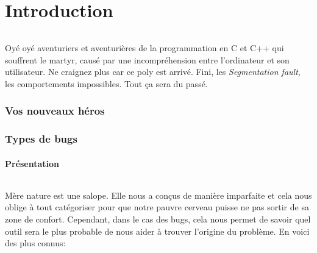 \part{Introduction}

\paragraph{} Oyé oyé aventuriers et aventurières de la programmation en C et
C++ qui souffrent le martyr, causé par une incompréhension entre l'ordinateur
et son utilisateur. Ne craignez plus car ce poly est arrivé. Fini, les
\textit{Segmentation fault}, les comportements impossibles. Tout ça sera du
passé.

\section{Vos nouveaux héros}


\section{Types de bugs}

\subsection{Présentation}

\paragraph{} Mère nature est une salope. Elle nous a conçus de manière
imparfaite et cela nous oblige à tout catégoriser pour que notre pauvre cerveau
puisse ne pas sortir de sa zone de confort. Cependant, dans le cas des bugs,
cela nous permet de savoir quel outil sera le plus probable de nous aider à
trouver l'origine du problème. En voici des plus connus:


